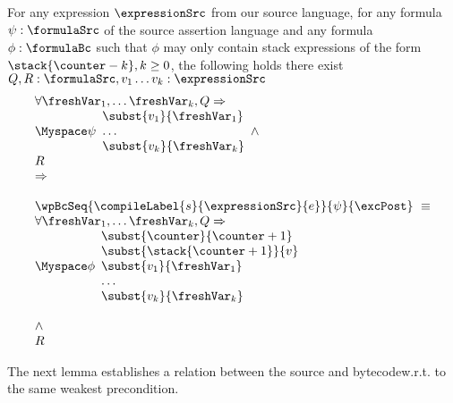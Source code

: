 \begin{exprSrcBcWp2} \label{pogEq:aux:exprSrcBcWp}
 For any expression $\expressionSrc$ from our source language, for any formula $\psi: \formulaSrc$  
of the source assertion language and any formula $\phi: \formulaBc$ such that $\phi$ may only 
contain stack expressions of the form     $\stack{\counter - k}, k \ge 0$, the following holds
there exist $ Q,R:\formulaSrc, v_1 \ldots v_k :\expressionSrc $
$$ \begin{array}{l}
 \forall \freshVar_1, \ldots  \freshVar_k   ,  Q \Rightarrow \\
 \Myspace \psi 
                                                                             \begin{array}{l}
									        \subst{v_1 }{ \freshVar_1 }  \\
										\ldots \\
										\subst{v_k}{ \freshVar_k } 
									     \end{array}
          \wedge \\ 
	  R  

      
  \\
\Rightarrow \\
 \\

  
	    \wpBcSeq{ \compileLabel{s}{\expressionSrc}{e} }{ \psi }{\excPost} \  \equiv \\ 
            \forall \freshVar_1, \ldots  \freshVar_k ,   Q \Rightarrow \\
	                      \Myspace \phi \begin{array}{l}
                                       \subst{\counter}{\counter + 1}\\
			               \subst{\stack{\counter +1}}{ v }\\
				       \subst{v_1 }{ \freshVar_1 }  \\
				       \ldots \\
				       \subst{v_k}{ \freshVar_k } 
                         \end{array} \\ \\
          \wedge \\ 
	  R 
  \end{array}$$
\end{exprSrcBcWp2}



The next lemma establishes  a relation between the source and bytecode\wpName w.r.t. to the same weakest precondition. 

